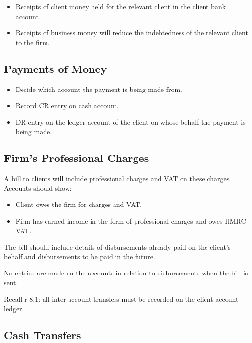 \documentclass[
]{article}
\providecommand{\tightlist}{%
  \setlength{\itemsep}{0pt}\setlength{\parskip}{0pt}}
\begin{document}
\begin{itemize}
\tightlist
\item
  Receipts of client money held for the relevant client in the client
  bank account
\item
  Receipts of business money will reduce the indebtedness of the
  relevant client to the firm.
\end{itemize}

\hypertarget{payments-of-money}{%
\subsection{Payments of Money}\label{payments-of-money}}

\begin{itemize}
\tightlist
\item
  Decide which account the payment is being made from.
\item
  Record CR entry on cash account.
\item
  DR entry on the ledger account of the client on whose behalf the
  payment is being made.
\end{itemize}

\hypertarget{firms-professional-charges}{%
\subsection{Firm's Professional
Charges}\label{firms-professional-charges}}

A bill to clients will include professional charges and VAT on these
charges. Accounts should show:

\begin{itemize}
\tightlist
\item
  Client owes the firm for charges and VAT.
\item
  Firm has earned income in the form of professional charges and owes
  HMRC VAT.
\end{itemize}

The bill should include details of disbursements already paid on the
client's behalf and disbursements to be paid in the future.

No entries are made on the accounts in relation to disbursements when
the bill is sent.

Recall r 8.1: all inter-account transfers must be recorded on the client
account ledger.

\hypertarget{cash-transfers}{%
\subsection{Cash Transfers}\label{cash-transfers}}
\end{document}
